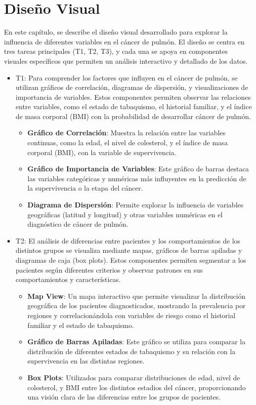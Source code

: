 \documentclass[10pt,journal,compsoc]{IEEEtran}
\begin{document}
\section{Diseño Visual}
En este capítulo, se describe el diseño visual desarrollado para explorar la influencia de diferentes variables en el cáncer de pulmón. El diseño se centra en tres tareas principales (T1, T2, T3), y cada una se apoya en componentes visuales específicos que permiten un análisis interactivo y detallado de los datos.

\begin{itemize}
\item T1:
Para comprender los factores que influyen en el cáncer de pulmón, se utilizan gráficos de correlación, diagramas de dispersión, y visualizaciones de importancia de variables. Estos componentes permiten observar las relaciones entre variables, como el estado de tabaquismo, el historial familiar, y el índice de masa corporal (BMI) con la probabilidad de desarrollar cáncer de pulmón.

\begin{itemize}
    \item \textbf{Gráfico de Correlación}: Muestra la relación entre las variables continuas, como la edad, el nivel de colesterol, y el índice de masa corporal (BMI), con la variable de supervivencia.
    \item \textbf{Gráfico de Importancia de Variables}: Este gráfico de barras destaca las variables categóricas y numéricas más influyentes en la predicción de la supervivencia o la etapa del cáncer.
    \item \textbf{Diagrama de Dispersión}: Permite explorar la influencia de variables geográficas (latitud y longitud) y otras variables numéricas en el diagnóstico de cáncer de pulmón.
\end{itemize}

\item T2:
El análisis de diferencias entre pacientes y los comportamientos de los distintos grupos se visualiza mediante mapas, gráficos de barras apiladas y diagramas de caja (box plots). Estos componentes permiten segmentar a los pacientes según diferentes criterios y observar patrones en sus comportamientos y características.

\begin{itemize}
    \item \textbf{Map View}: Un mapa interactivo que permite visualizar la distribución geográfica de los pacientes diagnosticados, mostrando la prevalencia por regiones y correlacionándola con variables de riesgo como el historial familiar y el estado de tabaquismo.
    \item \textbf{Gráfico de Barras Apiladas}: Este gráfico se utiliza para comparar la distribución de diferentes estados de tabaquismo y su relación con la supervivencia en las distintas regiones.
    \item \textbf{Box Plots}: Utilizados para comparar distribuciones de edad, nivel de colesterol, y BMI entre los distintos estadios del cáncer, proporcionando una visión clara de las diferencias entre los grupos de pacientes.
\end{itemize}


\end{itemize}
\end{document}
